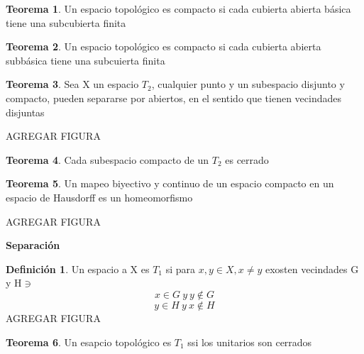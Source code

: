 \documentclass{article}
\theoremstyle{definition}
\newtheorem{definition}{Definición}[section]
\newtheorem{theorem}{Teorema}[section]
\begin{document}

\begin{theorem}
	Un espacio topológico es compacto si cada cubierta abierta básica tiene una subcubierta finita
\end{theorem}
\begin{theorem}
	Un espacio topológico es compacto si cada cubierta abierta subbásica tiene una subcuierta finita
\end{theorem}


\begin{theorem}
	Sea X un espacio $T_2$, cualquier punto y un subespacio disjunto y compacto, pueden separarse por abiertos, en el sentido que tienen vecindades disjuntas
	
	AGREGAR FIGURA
\end{theorem}


\begin{theorem}

	Cada subespacio compacto de un $T_2$ es cerrado
\end{theorem}
\begin{theorem}
	Un mapeo biyectivo y continuo de un espacio compacto en un espacio de Hausdorff es un homeomorfismo
	
	AGREGAR FIGURA
\end{theorem}
\begin{LARGE}
	\textbf{Separación}
\end{LARGE}
\begin{definition}
	Un espacio a X es $T_1$ si para $x,y\in X, x\neq y$ exosten vecindades G y H$\ni$
	\[x\in G \ y \ y\not\in G\]
	\[y\in H \ y \ x\not\in H\]
	AGREGAR FIGURA
\end{definition}
\begin{theorem}
	Un esapcio topológico es $T_1$ ssi los unitarios son cerrados
\end{theorem}

\end{document}

